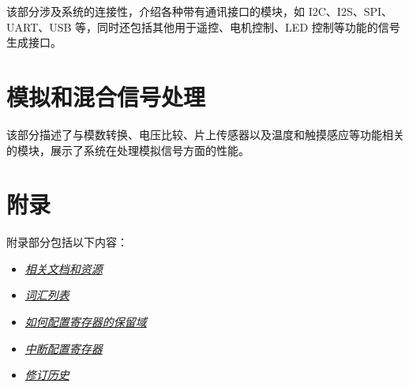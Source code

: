 \documentclass[openany, 10pt]{book}
\begin{document}
该部分涉及系统的连接性，介绍各种带有通讯接口的模块，如 I2C、I2S、SPI、UART、USB 等，同时还包括其他用于遥控、电机控制、LED 控制等功能的信号生成接口。







\part{模拟和混合信号处理}


该部分描述了与模数转换、电压比较、片上传感器以及温度和触摸感应等功能相关的模块，展示了系统在处理模拟信号方面的性能。




\part{附录}\label{appendix}

附录部分包括以下内容：

\begin{itemize}
    \item \hyperref[sec:resources]{\textit{相关文档和资源}}
    \item \hyperref[glossary]{\textit{词汇列表}}
    \item \hyperref[programming-reserved-field]{\textit{如何配置寄存器的保留域}}
    \item \hyperref[interrupt-config-registers]{\textit{中断配置寄存器}}
    \item \hyperref[revision-history]{\textit{修订历史}}
\end{itemize}



\clearpage


\clearpage


\clearpage


\clearpage


\clearpage


\clearpage

\end{document}
